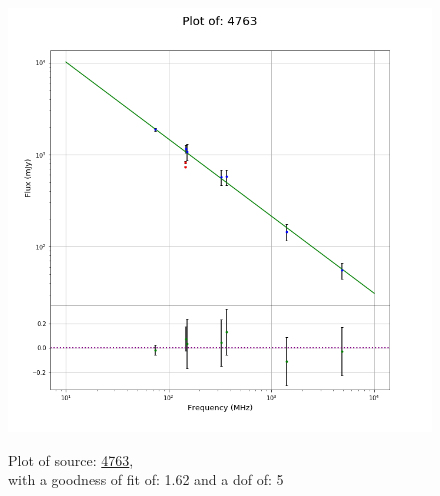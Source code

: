 \documentclass{article}
\begin{document}
\begin{figure}[H]
    \centering
    \begin{minipage}{.5\textwidth}
        \centering
        \includegraphics[scale = 0.35]{KmeulenSimSource_1hr/1hr4763.png}
        \captionsetup{labelformat=empty}
        \caption{Plot of source: \href{http://banana.transientskp.org/r4/vlo_KmeulenSimSource/runningcatalog/4763}{4763},\\with a goodness of fit of: 1.62 and a dof of: 5}
        \addtocounter{figure}{-1}
        \label{KmeulenSimSource:1hr:4763:plot}
    \end{minipage}%
    \begin{minipage}{0.5\textwidth}
        \centering


\end{minipage}
\end{figure}
\end{document}
